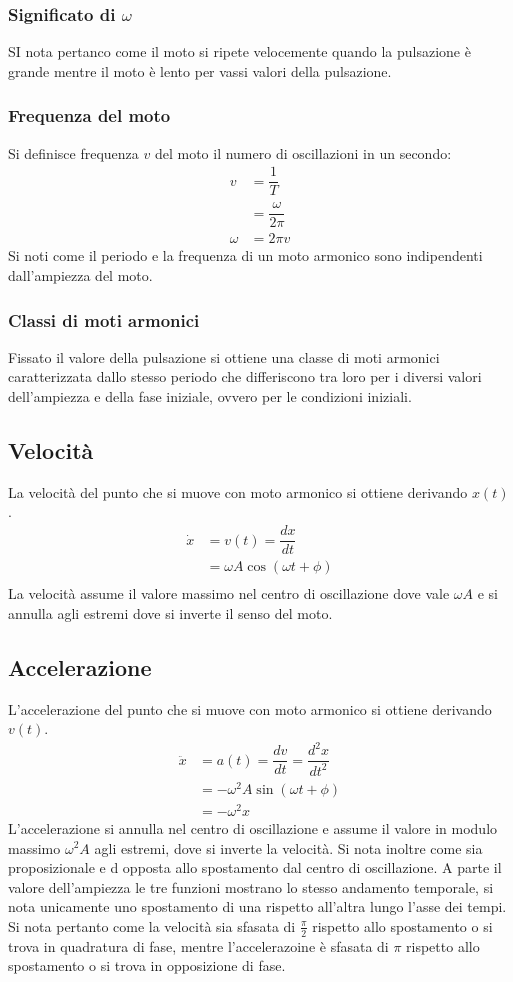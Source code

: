 \documentclass[class=book, crop=false, oneside, 12pt]{standalone}
\begin{document}
		\subsubsection{Significato di $\omega$}
		SI nota pertanco come il moto si ripete velocemente quando la pulsazione \`e grande mentre il moto \`e lento per vassi valori della pulsazione.
		\subsubsection{Frequenza del moto}
		Si definisce frequenza $v$ del moto il numero di oscillazioni in un secondo:
		\begin{align*}
			v &= \dfrac{1}{T}\\
			  &= \dfrac{\omega}{2\pi}\\
			\omega &= 2\pi v
		\end{align*}
		Si noti come il periodo e la frequenza di un moto armonico sono indipendenti dall'ampiezza del moto.
		\subsubsection{Classi di moti armonici}
		Fissato il valore della pulsazione si ottiene una classe di moti armonici caratterizzata dallo stesso periodo che differiscono tra loro per i diversi valori dell'ampiezza e della fase iniziale, ovvero per le condizioni iniziali.
	\subsection{Velocit\`a}
	La velocit\`a del punto che si muove con moto armonico si ottiene derivando $x(t)$.
	\begin{align*}
		\dot{x} &= v(t) = \dfrac{dx}{dt}\\
		  &=\omega A \cos(\omega t+\phi)\\
	\end{align*}
	La velocit\`a assume il valore massimo nel centro di oscillazione dove vale $\omega A$ e si annulla agli estremi dove si inverte il senso del moto.
	\subsection{Accelerazione}
	L'accelerazione del punto che si muove con moto armonico si ottiene derivando $v(t)$.
	\begin{align*}
		\ddot{x} &= a(t) = \dfrac{dv}{dt} = \dfrac{d^2x}{dt^2}\\
		       &= -\omega^2 A \sin(\omega t + \phi)\\
		       &= -\omega^2 x
	\end{align*}
	L'accelerazione si annulla nel centro di oscillazione e assume il valore in modulo massimo $\omega^2 A$ agli estremi, dove si inverte la velocit\`a.
	Si nota inoltre come sia proposizionale e d opposta allo spostamento dal centro di oscillazione.
	A parte il valore dell'ampiezza le tre funzioni mostrano lo stesso andamento temporale, si nota unicamente uno spostamento di una rispetto all'altra lungo l'asse dei tempi.
	Si nota pertanto come la velocit\`a sia sfasata di $\frac{\pi}{2}$  rispetto allo spostamento o si trova in quadratura di fase, mentre l'accelerazoine \`e sfasata di $\pi$ rispetto allo spostamento o si trova in opposizione di fase.
\end{document}
